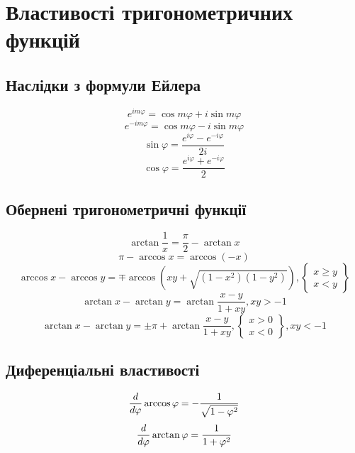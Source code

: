 \chapter{Властивості тригонометричних функцій}
\label{ch:trigonometric}

\section{Наслідки з формули Ейлера}
%
\begin{equation}
e^{im \varphi} = \cos m \varphi + i \sin m \varphi
\end{equation}
%
\begin{equation}
e^{-im \varphi} = \cos m \varphi - i \sin m \varphi
\end{equation}
%
\begin{equation}
\sin \varphi = \frac{e^{i \varphi} - e^{- i \varphi}}{2i}
\end{equation}
%
\begin{equation}
\cos \varphi = \frac{e^{i \varphi} + e^{- i \varphi}}{2}
\end{equation}
%
\section{Обернені тригонометричні функції}
%
\begin{equation}
\arctan \frac{1}{x} = \frac{\pi}{2} - \arctan x
\end{equation}
%
\begin{equation}
\pi - \arccos x = \arccos (-x)
\end{equation}
%
\begin{equation}
\arccos x - \arccos y = \mp \arccos \left( 
xy + \sqrt{(1-x^2)(1-y^2)} \right),
\left\{ \begin{array}{c} x \ge y \\ x < y  \end{array} \right\}
\end{equation}
%
\begin{equation}
\arctan x - \arctan y = 
\arctan \frac{x-y}{1+xy}, xy > -1 
\end{equation}
%
\begin{equation}
\arctan x - \arctan y = \pm \pi + \arctan \frac{x-y}{1+xy}, 
\left\{ \begin{array}{c} x > 0 \\ x < 0  \end{array} \right\}, xy < -1 
\end{equation}
%
\section{Диференціальні властивості}
%
\begin{equation}
\frac{d }{d \varphi} \arccos \varphi = - \frac{1}{ \sqrt{1 - \varphi^2} }
\end{equation}
%
\begin{equation}
\frac{d }{d \varphi} \arctan \varphi = \frac{1}{1 + \varphi^2}
\end{equation}
%

